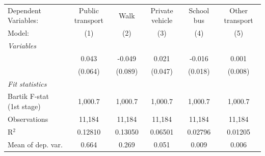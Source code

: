 \begin{tabular}{lccccc}
   \tabularnewline \midrule \midrule
   Dependent Variables:                                                  & Public transport & Walk    & Private vehicle & School bus & Other transport\\  
   Model:                                                                & (1)              & (2)     & (3)             & (4)        & (5)\\  
   \midrule
   \emph{Variables}\\
        & 0.043            & -0.049  & 0.021           & -0.016     & 0.001\\   
                                                                         & (0.064)          & (0.089) & (0.047)         & (0.018)    & (0.008)\\   
   \midrule
   \emph{Fit statistics}\\
   Bartik F-stat (1st stage)                                     & 1,000.7          & 1,000.7 & 1,000.7         & 1,000.7    & 1,000.7\\  
   Observations                                                          & 11,184           & 11,184  & 11,184          & 11,184     & 11,184\\  
   R$^2$                                                                 & 0.12810          & 0.13050 & 0.06501         & 0.02796    & 0.01205\\  
   Mean of dep. var.                                                     & 0.664            & 0.269   & 0.051           & 0.009      & 0.006\\  
\bottomrule
\end{tabular}

